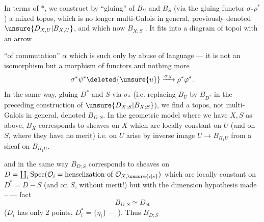 In terms of $*$, we construct by ``gluing'' of $B_U$ and  $B_S$ (via the gluing functor $\sigma_*\rho^*$) a mixed topos, which is no longer multi-Galois in general, previously denoted $\unsure{D_{X,U}|B_{X,U}}$, and which  now   $B_{X;S}$   . It fits into a diagram of topoi
with an arrow


``of commutation'' $\alpha$ which is such only by abuse of language --- it is not an isomorphism  but a morphism of functors and nothing more
\[
 \sigma^*\psi^*\deleted{\unsure{u}}\xrightarrow{\alpha_X}\rho^*\varphi^*.
\]
In the same way, gluing $D^*$ and $S$ via $\sigma_*$ (i.e. replacing $B_U$ by $B_{D^*}$ in the preceding construction of $\unsure{D_{X;S}|B_{X;S}}$), we find a topos, not multi-Galois in general, denoted $B_{D;S}$. In the  geometric model where we have $X,S$ as above,
$B_X$ corresponds to sheaves on $X$ which are  locally constant on $U$ (and on $S$, where they have no merit) i.e. on $U$ arise by inverse image   $U\longrightarrow B_{\Pi_1 U}$ from a sheaf on $B_{\Pi_1 U}$.

and in the same way $B_{D;S}$ corresponds to sheaves on $D=\coprod_i\operatorname{Spec}(\mathcal O_i=\text{henselization of }\mathcal O_{X,\unsure{i|s}})$  which are locally constant on $D^*=D-S$ (and on $S$, without merit!) but with the dimension hypothesis made -- ---  fact
\[
 B_{D;S}\simeq D_{\text{ét}}
\]
($D_i$ has only 2 points, $D_i^*=\{\eta_i\}$ --- ). Thus $B_{D;S}$ 


